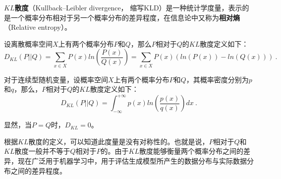 


\textbf{$KL$散度}（Kullback–Leibler divergence， 缩写KLD）是一种统计学度量，表示的是一个概率分布相对于另一个概率分布的差异程度，在信息论中又称为\textbf{相对熵}（Relative entropy）。

设离散概率空间$X$上有两个概率分布$P$和$Q$，那么$P$相对于$Q$的$KL$散度定义如下：
\begin{equation}
D_{KL}(P||Q)=\sum_{x\in X}P(x)ln(\frac{P(x)}{Q(x)})=\sum_{x\in X}P(x)(ln(P(x))-ln(Q(x)))~.
\end{equation}

对于连续型随机变量，设概率空间$X$上有两个概率分布$P$和$Q$，其概率密度分别为$p$和$q$，那么，$P$相对于$Q$的$KL$散度定义如下：
\begin{equation}
D_{KL}(P||Q)=\int_{-\infty}^{+\infty}p(x)ln(\frac{p(x)}{q(x)})dx~.
\end{equation}

显然，当$P=Q$时，$D_{KL}=0$。

根据$KL$散度的定义，可以知道此度量是没有对称性的。也就是说，$P$相对于$Q$和$KL$散度一般并不等于$Q$相对于$P$的。由于$KL$散度能够衡量两个概率分布之间的差异，现在广泛用于机器学习中，用于评估生成模型所产生的数据分布与实际数据分布之间的差异程度。